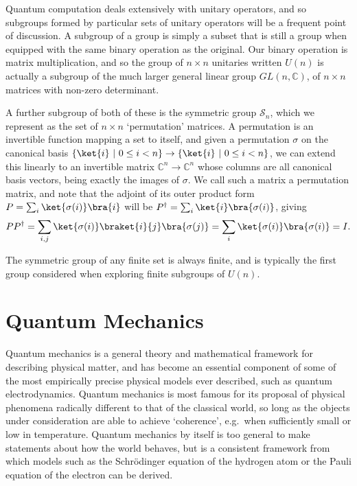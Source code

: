 Quantum computation deals extensively with unitary operators, and so subgroups formed by particular sets of unitary operators will be a frequent point of discussion. A subgroup of a group is simply a subset that is still a group when equipped with the same binary operation as the original. Our binary operation is matrix multiplication, and so the group of $n \times n$ unitaries written $U(n)$ is actually a subgroup of the much larger general linear group $GL(n, \mathbb{C})$, of $n \times n$ matrices with non-zero determinant.

A further subgroup of both of these is the symmetric group $\mathcal{S}_n$, which we represent as the set of $n \times n$ `permutation' matrices. A permutation is an invertible function mapping a set to itself, and given a permutation $\sigma$ on the canonical basis $\{\ket{i}\ |\ 0 \leq i < n\} \to \{\ket{i}\ |\ 0 \leq i < n\}$, we can extend this linearly to an invertible matrix $\mathbb{C}^n \to \mathbb{C}^n$ whose columns are all canonical basis vectors, being exactly the images of $\sigma$. We call such a matrix a permutation matrix, and note that the adjoint of its outer product form $P = \sum_i \ket{\sigma(i)}\bra{i}$ will be $P^{\dagger} = \sum_i \ket{i}\bra{\sigma(i)}$, giving
\begin{align*}
	PP^\dagger = \sum_{i,j} \ket{\sigma(i)}\braket{i}{j}\bra{\sigma(j)} = \sum_i \ket{\sigma(i)}\bra{\sigma(i)} = I.
\end{align*}

The symmetric group of any finite set is always finite, and is typically the first group considered when exploring finite subgroups of $U(n)$.

\section{Quantum Mechanics}\label{qm}

Quantum mechanics is a general theory and mathematical framework for describing physical matter, and has become an essential component of some of the most empirically precise physical models ever described, such as quantum electrodynamics. Quantum mechanics is most famous for its proposal of physical phenomena radically different to that of the classical world, so long as the objects under consideration are able to achieve `coherence', e.g.\ when sufficiently small or low in temperature. Quantum mechanics by itself is too general to make statements about how the world behaves, but is a consistent framework from which models such as the Schrödinger equation of the hydrogen atom or the Pauli equation of the electron can be derived.

